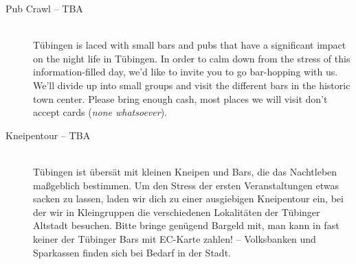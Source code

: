 \begin{description}
\ifml
	\item[Pub Crawl -- TBA]~\\
	Tübingen is laced with small bars and pubs that have a significant impact on the night life in Tübingen.
	In order to calm down from the stress of this information-filled day, we'd like to invite you to go bar-hopping with us.
	We'll divide up into small groups and visit the different bars in the historic town center.
	Please bring enough cash, most places we will visit don't accept cards (\emph{none whatsoever}).
\else
	\item[Kneipentour -- TBA]~\\
	Tübingen ist übersät mit kleinen Kneipen und Bars, die das Nachtleben maßgeblich bestimmen.
	Um den Stress der ersten Veranstaltungen etwas sacken zu lassen, laden wir dich zu einer ausgiebigen Kneipentour ein,
	bei der wir in Kleingruppen die verschiedenen Lokalitäten der Tübinger Altstadt besuchen.
	Bitte bringe genügend Bargeld mit, man kann in fast keiner der Tübinger Bars mit EC-Karte zahlen! -- Volksbanken und Sparkassen finden sich bei Bedarf in der Stadt.
\fi

\ifbachelor \pagebreak  \fi




\end{description}
